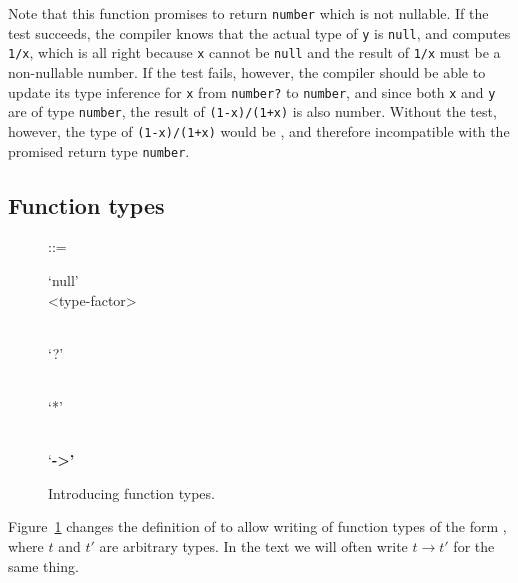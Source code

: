 \documentclass[droidmono,libertine,twoside,user,unofficial]{ecarticle}
\def\<#1>{\synt{#1}}
\begin{document}
Note that this function promises to return \texttt{number} which is
not nullable.  If the test  succeeds, the compiler
knows that the actual type of \texttt{y} is \texttt{null}, and
computes \texttt{1/x}, which is all right because \texttt{x} cannot be
\texttt{null} and the result of \texttt{1/x} must be a non-nullable
number.  If the test fails, however, the compiler should be able to
update its type inference for \texttt{x} from \texttt{number?} to
\texttt{number}, and since both \texttt{x} and \texttt{y} are of type
\texttt{number}, the result of \texttt{(1-x)/(1+x)} is also number.
Without the test, however, the type of \texttt{(1-x)/(1+x)} would be
, and therefore incompatible with the promised return
type \texttt{number}.


\subsection{Function types}
\label{sec:function-types}

\begin{figure}[bt]
  \<type> ::=
  \begin{syntdiag}
    \begin{rep}
        \begin{rep}
          \begin{stack}
            `null' \\
            <type-factor>
            \begin{stack}
              \\
              `?'
            \end{stack}
          \end{stack}
            \\
            `*'
        \end{rep}
      \\
      `\bfseries ->'
    \end{rep}
  \end{syntdiag}
  
  \caption{Introducing function types.}
  \label{fig:function-type-grammar}
\end{figure}


Figure~\ref{fig:function-type-grammar} changes the definition of
\<type> to allow writing of function types of the form
, where $t$ and $t'$ are arbitrary types.  In the text
we will often write $t\to t'$ for the same thing.
\end{document}
